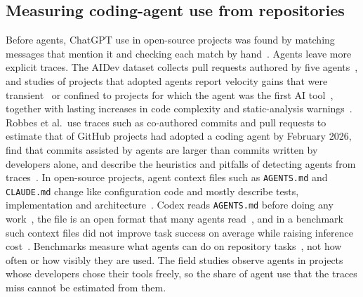\documentclass{article}
\begin{document}
\subsection{Measuring coding-agent use from repositories}
Before agents, ChatGPT use in open-source projects was found by matching messages that mention it and checking each match by hand~\cite{tufano2024chatgpt}. Agents leave more explicit traces. The AIDev dataset collects pull requests authored by five agents~\cite{li2025aidev}, and studies of projects that adopted agents report velocity gains that were transient~\cite{he2026cursor} or confined to projects for which the agent was the first AI tool~\cite{agarwal2026aiides}, together with lasting increases in code complexity and static-analysis warnings~\cite{he2026cursor,agarwal2026aiides}. Robbes et al.\ use traces such as co-authored commits and pull requests to estimate that \robbesrate{} of \robbesprojects{} GitHub projects had adopted a coding agent by February 2026, find that commits assisted by agents are larger than commits written by developers alone, and describe the heuristics and pitfalls of detecting agents from traces~\cite{robbes2026agenticmuch,robbes2026heuristics}. In open-source projects, agent context files such as \texttt{AGENTS.md} and \texttt{CLAUDE.md} change like configuration code and mostly describe tests, implementation and architecture~\cite{chatlatanagulchai2025agentreadmes}. Codex reads \texttt{AGENTS.md} before doing any work~\cite{openai2026agentsmd}, the file is an open format that many agents read~\cite{agentsmd2026site}, and in a benchmark such context files did not improve task success on average while raising inference cost~\cite{gloaguen2026agentsmd}. Benchmarks measure what agents can do on repository tasks~\cite{jimenez2023swebench,yang2024sweagent}, not how often or how visibly they are used. The field studies observe agents in projects whose developers chose their tools freely, so the share of agent use that the traces miss cannot be estimated from them.
\end{document}

